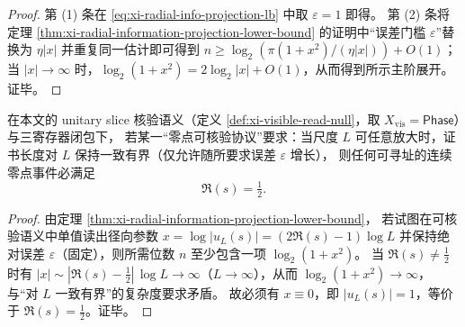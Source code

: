 \begin{proof}
第 (1) 条在 \eqref{eq:xi-radial-info-projection-lb} 中取 \(\varepsilon=1\) 即得。
第 (2) 条将定理 \ref{thm:xi-radial-information-projection-lower-bound} 的证明中“误差门槛 \(\varepsilon\)”替换为 \(\eta|x|\) 并重复同一估计即可得到
\(
n\ge \log_2(\pi(1+x^2)/(\eta|x|))+O(1)
\)；
当 \(|x|\to\infty\) 时，\(\log_2(1+x^2)=2\log_2|x|+O(1)\)，从而得到所示主阶展开。证毕。
\end{proof}

\begin{corollary}[规模一致性刚性：\texorpdfstring{$\Re(s)=\tfrac12$}{Re(s)=1/2} 为唯一低复杂度切片]\label{cor:xi-critical-line-unique-low-complexity-slice}
在本文的 unitary slice 核验语义（定义 \ref{def:xi-visible-read-null}，取 \(X_{\mathrm{vis}}=\mathsf{Phase}\)）与三寄存器闭包下，
若某一“零点可核验协议”要求：当尺度 \(L\) 可任意放大时，证书长度对 \(L\) 保持一致有界（仅允许随所要求误差 \(\varepsilon\) 增长），
则任何可寻址的连续零点事件必满足
\[
\Re(s)=\tfrac12.
\]
\end{corollary}

\begin{proof}
由定理 \ref{thm:xi-radial-information-projection-lower-bound}，
若试图在可核验语义中单值读出径向参数 \(x=\log|u_L(s)|=(2\Re(s)-1)\log L\) 并保持绝对误差 \(\varepsilon\)（固定），则所需位数 \(n\) 至少包含一项 \(\log_2(1+x^2)\)。
当 \(\Re(s)\neq\tfrac12\) 时有 \(|x|\sim |\Re(s)-\tfrac12|\,\log L\to\infty\)（\(L\to\infty\)），从而 \(\log_2(1+x^2)\to\infty\)，与“对 \(L\) 一致有界”的复杂度要求矛盾。
故必须有 \(x\equiv 0\)，即 \(|u_L(s)|=1\)，等价于 \(\Re(s)=\tfrac12\)。证毕。
\end{proof}

\endinput

